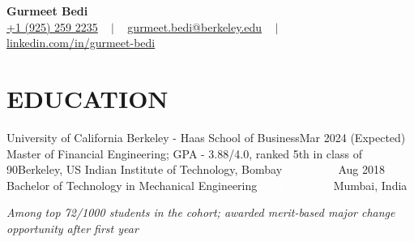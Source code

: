 


\begin{center}
{\Huge  \textbf{Gurmeet Bedi}} \\ \vspace{1pt}
\small
\href{tel:19252592235}{+1 (925) 259 2235} 
~ $\mid$ ~
\href{mailto:gurmeet.bedi@berkeley.edu}{ gurmeet.bedi@berkeley.edu} 
~ $\mid$ ~
\href{https://www.linkedin.com/in/gurmeet-bedi/}{linkedin.com/in/gurmeet-bedi} 
\\
\vspace{-8pt}
\end{center}


\section{EDUCATION}
  \resumeSubHeadingListStart
  \resumeSubheading
      {University of California Berkeley - Haas School of Business}{Mar 2024 (Expected)}
      {Master \textcolor{white}{}of Financial Engineering; GPA - 3.88/4.0, ranked 5th in class of 90}{Berkeley, US}{}
    \resumeSubheading
      {Indian Institute of Technology, Bombay}{\textcolor{white}{Jun 2014 - }Aug 2018}
      {Bachelor of Technology in Mechanical Engineering \textcolor{white}{GPA - 7.33/10}}{Mumbai, India}{}
      
    \begin{itemize}[leftmargin=0.0in, label={}]
    \small{\textit{Among top 72/1000 students in the cohort; awarded merit-based major change opportunity after first year}}
    \vspace{-3pt}
    \end{itemize}
  \resumeSubHeadingListEnd

